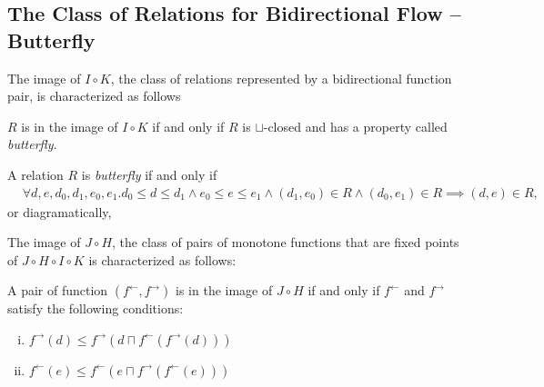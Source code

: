 \documentclass{llncs}
\newcommand{\ff}{{f^{\rightarrow}}}
\newcommand{\fb}{{f^{\leftarrow}}}
\newcommand{\join}{\sqcup}
\newcommand{\meet}{\sqcap}
\newcommand{\comp}{\circ}
\newcommand{\rotleq}{\rotatebox[origin=c]{90}{$\leq$}}
\begin{document}
  \subsection{The Class of Relations for Bidirectional Flow -- Butterfly}
  The image of $I \comp K$, the class of relations represented by a bidirectional function pair, is characterized as follows

  \begin{proposition}\label{prop:butterfly}
    $R$ is in the image of $I \comp K$ if and only if $R$ is $\join$-closed and has a property called \emph{butterfly}.
  \end{proposition}
  \begin{definition}
    A relation $R$ is \emph{butterfly} if and only if \begin{align*}
      &\forall d, e, d_{0}, d_{1 }, e_{0}, e_{1} .
      d_{0} \leq d \leq d_{1} \land e_{0} \leq e \leq e_{1} \land (d_{1}, e_{0}) \in R \land (d_{0}, e_{1}) \in R \implies (d, e) \in R,
    \end{align*}or diagramatically, \quad
  \end{definition}

  The image of $J \comp H$, the class of pairs of monotone functions that are fixed points of $J \comp H \comp I \comp K$ is characterized as follows:
  \begin{proposition} \label{prop:pair-nice}
    A pair of function $(\fb , \ff)$ is in the image of $J \comp H$ if and only if $\fb$ and $\ff$ satisfy the following conditions:
    \begin{enumerate}[i.]
      \item $\ff(d) \leq \ff(d \meet \fb (\ff(d)))$
      \item $\fb(e) \leq \fb(e \meet \ff (\fb(e)))$
    \end{enumerate}
  \end{proposition}
\end{document}
